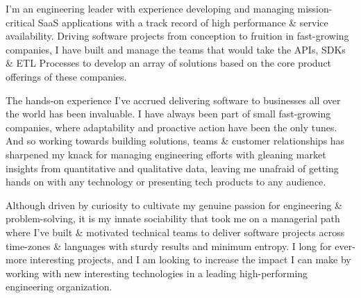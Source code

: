 

\begin{cvparagraph}

I'm an engineering leader with experience developing and managing mission-critical SaaS applications with a track record of high performance \& service availability. Driving software projects from conception to fruition in fast-growing companies, I have built and manage the teams that would take the APIs, SDKs \&  ETL Processes to develop an array of solutions based on the core product offerings of these companies.

The hands-on experience I've accrued delivering software to businesses all over the world has been invaluable. I have always been part of small fast-growing companies, where adaptability and proactive action have been the only tunes. And so working towards building solutions, teams \& customer relationships has sharpened my knack for managing engineering efforts with gleaning market insights from quantitative and qualitative data, leaving me unafraid of getting hands on with any technology or presenting tech products to any audience.

Although driven by curiosity to cultivate my genuine passion for engineering \& problem-solving, it is my innate sociability that took me on a managerial path where I've built \& motivated technical teams to deliver software projects across time-zones \& languages with sturdy results and minimum entropy. I long for ever-more interesting projects, and I am looking to increase the impact I can make by working with new interesting technologies in a leading high-performing engineering organization.
\end{cvparagraph}